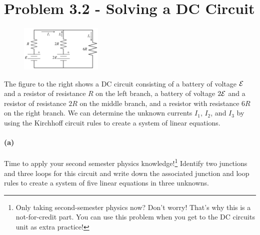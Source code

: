 \documentclass{article}
\begin{document}
\bigskip
\pagebreak
\section*{Problem 3.2 - Solving a DC Circuit}

\paragraph{}
\begingroup\setlength\intextsep{-5pt}
	\begin{figure}
		\includegraphics[width = 0.35\textwidth]{89-PS3-P2-Circuit}
	\end{figure}
The figure to the right shows a DC circuit consisting of a battery of voltage $\mathcal{E}$ and a resistor of resistance $R$ on the left branch, a battery of voltage $2\mathcal{E}$
and a resistor of resistance $2R$ on the middle branch, and a resistor with resistance $6R$ on the right branch.  We can determine the unknown currents $I_{1}$,
$I_{2}$, and $I_{3}$ by using the Kirchhoff circuit rules to create a system of linear equations.


\paragraph{(a)}		\extrapart
Time to apply your second semester physics knowledge!\footnote{Only taking second-semester physics now?  Don't worry!  That's why this is a not-for-credit part.  You can use
this problem when you get to the DC circuits unit as extra practice!}  Identify two junctions and three loops for this circuit and write down the associated junction and loop
rules to create a system of five linear equations in three unknowns.
\endgroup

\phline
\end{document}
